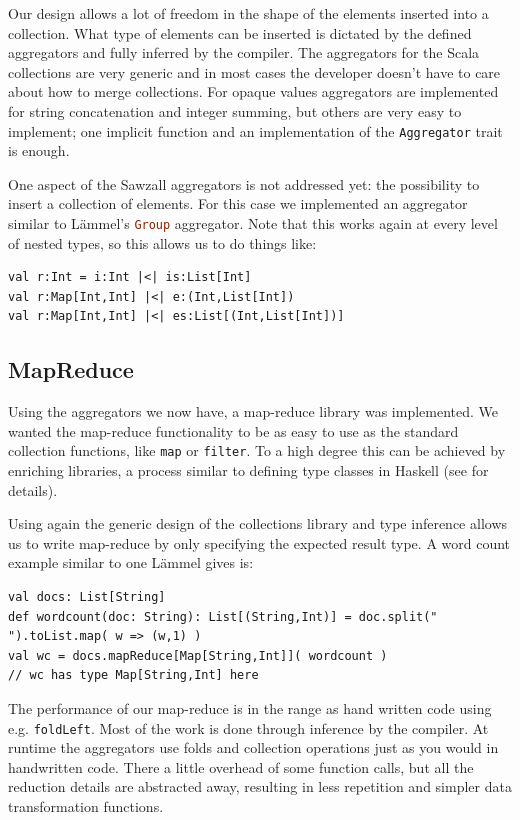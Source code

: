 \documentclass[10pt,a4paper]{article}
\begin{document}
Our design allows a lot of freedom in the shape of the elements inserted into a collection. What type of elements can be inserted is dictated by the defined aggregators and fully inferred by the compiler. The aggregators for the Scala collections are very generic and in most cases the developer doesn't have to care about how to merge collections. For opaque values aggregators are implemented for string concatenation and integer summing, but others are very easy to implement; one implicit function and an implementation of the \lstinline|Aggregator| trait is enough.

One aspect of the Sawzall aggregators is not addressed yet: the possibility to insert a collection of elements. For this case we implemented an aggregator similar to L\"ammel's \lstinline[language=haskell]|Group| aggregator. Note that this works again at every level of nested types, so this allows us to do things like:
\begin{lstlisting}
val r:Int = i:Int |<| is:List[Int]
val r:Map[Int,Int] |<| e:(Int,List[Int])
val r:Map[Int,Int] |<| es:List[(Int,List[Int])]
\end{lstlisting}

\subsection{MapReduce}

Using the aggregators we now have, a map-reduce library was implemented. We wanted the map-reduce functionality to be as easy to use as the standard collection functions, like \lstinline|map| or \lstinline|filter|. To a high degree this can be achieved by enriching libraries, a process similar to defining type classes in Haskell (see \cite{odersky2006pimp} for details).

Using again the generic design of the collections library and type inference allows us to write map-reduce by only specifying the expected result type. A word count example similar to one L\"ammel gives is:
\begin{lstlisting}
val docs: List[String]
def wordcount(doc: String): List[(String,Int)] = doc.split(" ").toList.map( w => (w,1) )
val wc = docs.mapReduce[Map[String,Int]]( wordcount )
// wc has type Map[String,Int] here
\end{lstlisting}

The performance of our map-reduce is in the range as hand written code using e.g. \lstinline|foldLeft|. Most of the work is done through inference by the compiler. At runtime the aggregators use folds and collection operations just as you would in handwritten code. There a little overhead of some function calls, but all the reduction details are abstracted away, resulting in less repetition and simpler data transformation functions.
\end{document}
